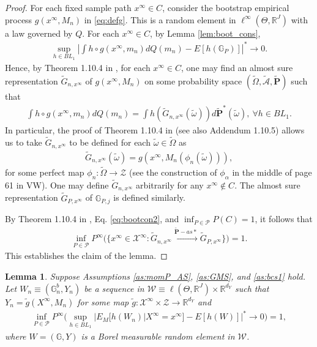 \documentclass[letterpaper,11pt]{article}
\theoremstyle{myplain}
\newtheorem{lemma}{Lemma}[section]
\theoremstyle{mydefinition}
\theoremstyle{myremark}
\renewcommand{\cite}{\citet}
\numberwithin{equation}{section}
\numberwithin{figure}{section}
\begin{document}
\begin{appendices}
\begin{proof}
For each fixed sample path $x^\infty\in C$, consider the bootstrap empirical process $g(x^\infty,M_n)$ in \eqref{eq:defg}. This is a random element in $\ell^\infty(\Theta,\mathbb R^J)$ with a law governed by $Q$. 
For each $x^\infty\in C$, by Lemma \ref{lem:boot_cons}, 
\begin{align}
\sup_{h\in BL_1}\left|\int h\circ g(x^\infty,m_n)dQ(m_n)-E[h(\mathbb G_P)]\right|^*\to 0.
\end{align}  
Hence, by Theorem 1.10.4 in \cite{Vaart_Wellner2000aBK}, for each $x^\infty\in C$, one may find an almost sure representation $\tilde G_{n,x^\infty}$ of $g(x^\infty,M_n)$ on some probability space $(\tilde\Omega,\tilde{\mathcal A},\tilde{\mathbf P})$ such that
\begin{align}
	\int h\circ g(x^\infty,m_n)dQ(m_n)=\int h(\tilde G_{n,x^\infty}(\tilde \omega))d\tilde{\mathbf P}^*(\tilde\omega),~\forall h\in BL_1.
\end{align}
In particular, the proof of Theorem 1.10.4 in \cite{Vaart_Wellner2000aBK} (see also Addendum 1.10.5) allows us to take $\tilde G_{n,x^\infty}$ to be defined for each $\tilde\omega\in\tilde\Omega$ as
\begin{align}
\tilde G_{n,x^\infty}(\tilde \omega)=g(x^\infty,M_n(\phi_n(\tilde \omega)))	,
\end{align}
for some perfect map $\phi_n:\tilde\Omega\to \mathcal Z$ (see the construction of $\phi_\alpha$ in the middle of page 61 in VW). One may define $\tilde G_{n,x^\infty}$ arbitrarily for any $x^\infty\notin C.$
The almost sure representation $\tilde G_{P,x^\infty}$ of $\mathbb G_{P,j}$ is defined similarly.
 
By Theorem  1.10.4 in \cite{Vaart_Wellner2000aBK}, Eq. \eqref{eq:bootcon2}, and $\inf_{P\in\mathcal P}P(C)=1$, it follows that
\begin{align}
	\inf_{P\in\mathcal P}P^\infty\Big(\big\{x^\infty\in \mathcal X^\infty:\tilde G_{n,x^\infty}\stackrel{\tilde{\mathbf P}-as*}{\to}\tilde G_{P,x^\infty}\big\}\Big)=1.
\end{align}
This establishes the claim of the lemma.
\end{proof}

\begin{lemma}\label{cor:asrep}
Suppose Assumptions \ref{as:momP_AS}, \ref{as:GMS}, and \ref{as:bcs1} hold.  Let $W_n\equiv (\mathbb G^b_n,Y_n)$ be a sequence in $\mathcal W\equiv\ell(\Theta,\mathbb R^J)\times \mathbb R^{d_Y}$  such that $Y_n=\tilde g(X^\infty, M_n)$ for some map $\tilde g:\mathcal X^\infty\times \mathcal Z\to\mathbb R^{d_Y}$ and
\begin{align}
\inf_{P\in \mathcal P} P^\infty\big(\sup_{h\in BL_1}|E_M[h(W_n)|X^\infty=x^\infty]-E[h(W)]|^*\to 0\big)=1,\label{eq:Wn_cons}
\end{align}
where $W=(\mathbb G,Y)$ is a Borel measurable random element in $\mathcal W$.  


\end{lemma}
\end{appendices}
\end{document}

